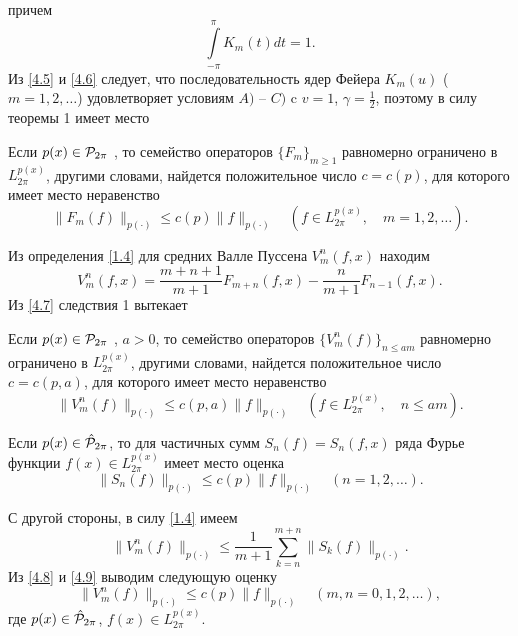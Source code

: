 причем
\begin{equation}\label{4.6}
    \int\limits_{-\pi}^{\pi}K_{m}(t)dt=1.
\end{equation}
Из \eqref{4.5} и \eqref{4.6} следует, что последовательность ядер Фейера $K_{m}(u)$ ($m=1,2,\ldots$) удовлетворяет условиям $A)$ -- $C)$ c $v=1$, $\gamma=\frac12$, поэтому в силу теоремы 1 имеет место
\begin{corollary}\label{1}
 Если $ p(x)\in {\cal P}_{2\pi} $ ,  то семейство операторов $\{F_{m}\}_{m\geq1}$ равномерно
ограничено в $L_{2\pi}^{p(x)}$, другими словами, найдется положительное число $c=c(p)$, для которого имеет место неравенство
$$
 \|F_{m}(f)\|_{p(\cdot)}\le c(p)\|f\|_{p(\cdot)}\quad  (f\in L_{2\pi}^{p(x)},\quad m=1,2,\ldots).
 $$
\end{corollary}

Из определения \eqref{1.4} для средних Валле Пуссена $V_m^n(f,x)$ находим
\begin{equation}\label{4.7}
    V_m^n(f,x)=\frac{m+n+1}{m+1}F_{m+n}(f,x)-\frac{n}{m+1}F_{n-1}(f,x).
\end{equation}
Из \eqref{4.7} следствия 1 вытекает
\begin{corollary}\label{2}
 Если $ p(x)\in {\cal P}_{2\pi} $ , $a>0$,  то семейство операторов $\{V_{m}^n(f)\}_{n\le am}$ равномерно
ограничено в $L_{2\pi}^{p(x)}$, другими словами, найдется положительное число $c=c(p,a)$, для которого имеет место неравенство
$$
 \|V_m^n(f)\|_{p(\cdot)}\le c(p,a)\|f\|_{p(\cdot)}\quad  (f\in L_{2\pi}^{p(x)},\quad n\le am).
 $$
\end{corollary}

Если $ p(x)\in \hat{\cal P}_{2\pi} $, то  для частичных сумм
 $S_n(f)=S_n(f,x)$ ряда Фурье функции $f(x)\in L^{p(x)}_{2\pi}$  имеет место \cite{Shar2} оценка
 \begin{equation}\label{4.8}
    \|S_n(f)\|_{p(\cdot)}\le c(p)\|f\|_{p(\cdot)}\quad(n=1,2,\ldots).
 \end{equation}

С другой стороны, в силу \eqref{1.4} имеем
\begin{equation}\label{4.9}
  \|V_m^n(f)\|_{p(\cdot)}\le \frac{1}{m+1}\sum_{k=n}^{m+n}\|S_k(f)\|_{p(\cdot)}.
 \end{equation}
Из \eqref{4.8} и \eqref{4.9} выводим следующую оценку
\begin{equation}\label{4.10}
  \|V_m^n(f)\|_{p(\cdot)}\le c(p)\|f\|_{p(\cdot)}\quad(m,n=0,1,2,\ldots),
 \end{equation}
где $ p(x)\in \hat{\cal P}_{2\pi} $, $f(x)\in L^{p(x)}_{2\pi}$.











